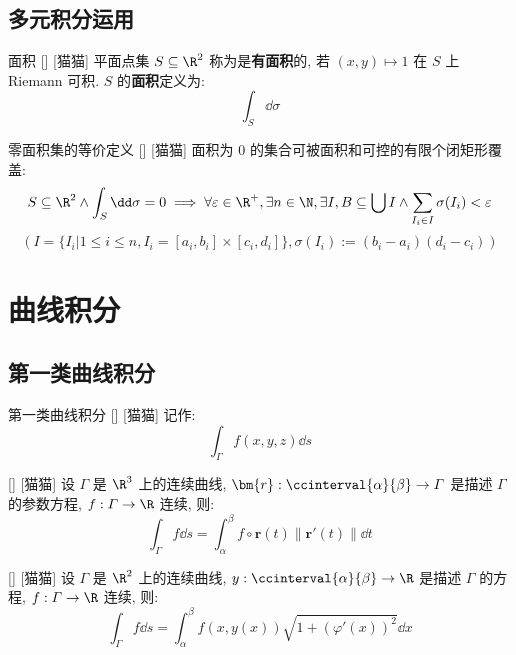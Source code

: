 \documentclass[UTF8]{ctexart}
\begin{document}
		\subsection{多元积分运用}
			
			\begin{dfn}
			    []
			    {面积}
			    []
			    [猫猫]
				平面点集 \(S\subseteq\R^2\) 称为是\textbf{有面积}的, 若 \((x,y)\mapsto 1\) 在 \(S\) 上 Riemann 可积. \(S\) 的\textbf{面积}定义为: 
				\[\int_S\dd\sigma\]
			\end{dfn}

			\begin{ppt}
				[]
				{零面积集的等价定义}
				[]
				[猫猫]
				面积为 \(0\) 的集合可被面积和可控的有限个闭矩形覆盖: 
				\[S\subseteq\R^2\wedge\int_S\dd\sigma=0\implies\forall\varepsilon\in\R^+, \exists n\in\N, \exists I, B\subseteq\bigcup I\wedge\sum_{I_i\in I}\sigma(I_i)<\varepsilon\]
				\[(I=\{I_i|1\leq i\leq n, I_i=[a_i,b_i]\times[c_i,d_i]\}, \sigma(I_i):=(b_i-a_i)(d_i-c_i))\]
			\end{ppt}

	\section{曲线积分}
			
		\subsection{第一类曲线积分}

			\begin{dfn}
			    []
			    {第一类曲线积分}
			    []
			    [猫猫]
				记作: 
				\[\int_\varGamma f(x,y,z)\dd s\]
			\end{dfn}

			\begin{thm}
				[]
				{}
				[]
				[猫猫]
				设 \(\varGamma\) 是 \(\R^3\) 上的连续曲线, \(\bm{r}:\ccinterval{\alpha}{\beta}\to\varGamma\) 是描述 \(\varGamma\) 的参数方程, \(f:\varGamma\to\R\) 连续, 则: 
				\[\int_\varGamma f\dd s=\int_\alpha^\beta f\circ\bm{r}(t)\|\bm{r}'(t)\|\dd t\]
			\end{thm}

			\begin{crl}
				[]
				{}
				[]
				[猫猫]
				设 \(\varGamma\) 是 \(\R^2\) 上的连续曲线, \(y:\ccinterval{\alpha}{\beta}\to\R\) 是描述 \(\varGamma\) 的方程, \(f:\varGamma\to\R\) 连续, 则: 
				\[\int_\varGamma f\dd s=\int_\alpha^\beta f(x,y(x))\sqrt{1+{(\varphi'(x))}^2}\dd x\]
			\end{crl}
\end{document}
